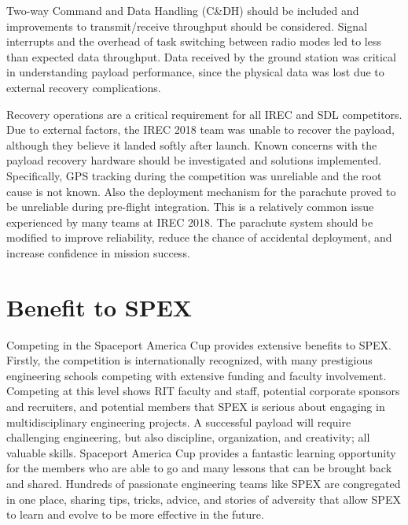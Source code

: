 \documentclass[conference]{IEEEtran} %
\begin{document}
Two-way Command and Data Handling (C\&DH) should be included and improvements to transmit/receive throughput should be considered. Signal interrupts and the overhead of task switching between radio modes led to less than expected data throughput. Data received by the ground station was critical in understanding payload performance, since the physical data was lost due to external recovery complications.

Recovery operations are a critical requirement for all IREC and SDL competitors. Due to external factors, the IREC 2018 team was unable to recover the payload, although they believe it landed softly after launch. Known concerns with the payload recovery hardware should be investigated and solutions implemented. Specifically, GPS tracking during the competition was unreliable and the root cause is not known. Also the deployment mechanism for the parachute proved to be unreliable during pre-flight integration. This is a relatively common issue experienced by many teams at IREC 2018. The parachute system should be modified to improve reliability, reduce the chance of accidental deployment, and increase confidence in mission success.


\section{Benefit to SPEX}
\label{sec:benefit}

Competing in the Spaceport America Cup provides extensive benefits to SPEX. Firstly, the competition is internationally recognized, with many prestigious engineering schools competing with extensive funding and faculty involvement. Competing at this level shows RIT faculty and staff, potential corporate sponsors and recruiters, and potential members that SPEX is serious about engaging in multidisciplinary engineering projects. A successful payload will require challenging engineering, but also discipline, organization, and creativity; all valuable skills. Spaceport America Cup provides a fantastic learning opportunity for the members who are able to go and many lessons that can be brought back and shared. Hundreds of passionate engineering teams like SPEX are congregated in one place, sharing tips, tricks, advice, and stories of adversity that allow SPEX to learn and evolve to be more effective in the future.
\end{document}
